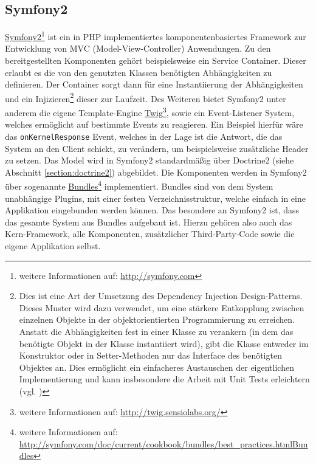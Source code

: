 \subsection{Symfony2}\label{section:symfony2}
\href{http://symfony.com}{Symfony2}\footnote{weitere Informationen auf: \url{http://symfony.com}} ist ein in PHP implementiertes komponentenbasiertes Framework zur Entwicklung von MVC (Model-View-Controller) Anwendungen. Zu den bereitgestellten Komponenten gehört beispielsweise ein Service Container. Dieser erlaubt es die von den genutzten Klassen benötigten Abhängigkeiten zu definieren. Der Container sorgt dann für eine Instantiierung der Abhängigkeiten und ein Injizieren\footnote{Dies ist eine Art der Umsetzung des Dependency Injection Design-Patterns. Dieses Muster wird dazu verwendet, um eine stärkere Entkopplung zwischen einzelnen Objekte in der objektorientierten Programmierung zu erreichen. Anstatt die Abhängigkeiten fest in einer Klasse zu verankern (in dem das benötigte Objekt in der Klasse instantiiert wird), gibt die Klasse entweder im Konstruktor oder in Setter-Methoden nur das Interface des benötigten Objektes an. Dies ermöglicht ein einfacheres Austauschen der eigentlichen Implementierung und kann insbesondere die Arbeit mit Unit Tests erleichtern (vgl. \cite{Fowler2004})} dieser zur Laufzeit. Des Weiteren bietet Symfony2 unter anderem die eigene Template-Engine \href{http://twig.sensiolabs.org/}{Twig}\footnote{weitere Informationen auf: \url{http://twig.sensiolabs.org/}}, sowie ein Event-Listener System, welches ermöglicht auf bestimmte Events zu reagieren. Ein Beispiel hierfür wäre das \texttt{onKernelResponse} Event, welches in der Lage ist die Antwort, die das System an den Client schickt, zu verändern, um beispielsweise zusätzliche Header zu setzen. Das Model wird in Symfony2 standardmäßig über Doctrine2 (siehe Abschnitt \ref{section:doctrine2}) abgebildet.
Die Komponenten werden in Symfony2 über sogenannte \href{http://symfony.com/doc/current/cookbook/bundles/best_practices.htmlBundles}{Bundles}\footnote{weitere Informationen auf: \url{http://symfony.com/doc/current/cookbook/bundles/best_practices.htmlBundles}} implementiert. Bundles sind von dem System unabhängige Plugins, mit einer festen Verzeichnisstruktur, welche einfach in eine Applikation eingebunden werden können. Das besondere an Symfony2 ist, dass das gesamte System aus Bundles aufgebaut ist. Hierzu gehören also auch das Kern-Framework, alle Komponenten, zusätzlicher Third-Party-Code sowie die eigene Applikation selbst.

